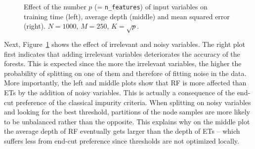 \begin{figure}
\hspace{-4cm}
\caption{Effect of the number $p$ (= \texttt{n\_features}) of input variables on training time (left), average depth (middle) and mean squared error (right). $N=1000$, $M=250$, $K=\sqrt{p}$.}
\label{fig:5:artificial:p}
\end{figure}

Next, Figure~\ref{fig:5:artificial:p} shows the effect of irrelevant and noisy
variables. The right plot first indicates that adding irrelevant variables
deteriorates the accuracy of the forests. This is expected since the more the
irrelevant variables, the higher the probability of splitting on one of them
and therefore of fitting noise in the data. More importantly, the left and
middle plots show that RF is more affected than ETs by the addition of noisy
variables. This is actually a consequence of the end-cut preference of the classical impurity criteria. When
splitting on noisy variables and looking for the best threshold, partitions of
the node samples are more likely to be unbalanced rather than the opposite.
This explains why on the middle plot the average depth of RF eventually gets
larger than the depth of ETs -- which suffers less from end-cut preference since
thresholds are not optimized locally.

